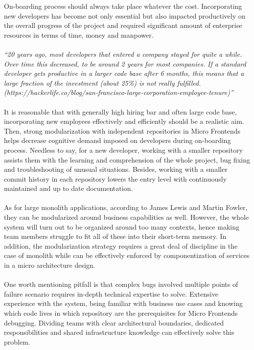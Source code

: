 \documentclass[a4paper]{book}
\begin{document}
On-boarding process should always take place whatever the cost. Incorporating new developers has become not only essential but also impacted productively on the overall progress of the project and required significant amount of enterprise resources in terms of time, money and manpower. 
\\ 
\\
\textit{“20 years ago, most developers that entered a company stayed for quite a while. Over time this decreased, to be around 2 years for most companies. If a standard developer gets productive in a larger code base after 6 months, this means that a large fraction of the investment (about 25\%) is not really fulfilled.  (https://hackerlife.co/blog/san-francisco-large-corporation-employee-tenure)”} \cite{Rap20}
\\
\\
It is reasonable that with generally high hiring bar and often large code base, incorporating new employees effectively and efficiently should be a realistic aim. Then, strong modularization with independent repositories in Micro Frontends helps decrease cognitive demand imposed on developers during on-boarding process. Needless to say, for a new developer, working with a smaller repository assists them with the learning and comprehension of the whole project, bug fixing and troubleshooting of unusual situations. Besides, working with a smaller commit history in each repository lowers the entry level with continuously maintained and up to date documentation. 
\\
\\
As for large monolith applications, according to James Lewis and Martin Fowler, they can be modularized around business capabilities as well. However, the whole system will turn out to be organized around too many contexts, hence making team members struggle to fit all of these into their short-term memory. In addition, the modularization strategy requires a great deal of discipline in the case of monolith while can be effectively enforced by componentization of services in a micro architecture design. \cite{Lew14}
\\
\\
One worth mentioning pitfall is that complex bugs involved multiple points of failure scenario requires in-depth technical expertise to solve. Extensive experience with the system, being familiar with business use cases and knowing which code lives in which repository are the prerequisites for Micro Frontends debugging. Dividing teams with clear architectural boundaries, dedicated responsibilities and shared infrastructure knowledge can effectively solve this problem.
\end{document}
